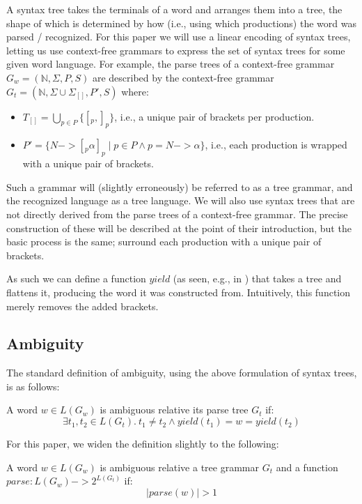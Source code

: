 \documentclass[acmsmall,review,anonymous]{acmart}\settopmatter{printfolios=true,printccs=false,printacmref=false}
\newcommand{\NT}{\mathbb{N}} %
\newcommand{\T}{\Sigma} %
\newcommand{\yield}{\mathit{yield}} %
\newcommand{\parse}{\mathit{parse}} %
\begin{document}
A syntax tree takes the terminals of a word and arranges them into a tree, the shape of which is determined by how (i.e., using which productions) the word was parsed / recognized. For this paper we will use a linear encoding of syntax trees, letting us use context-free grammars to express the set of syntax trees for some given word language. For example, the parse trees of a context-free grammar $G_w = (\NT, \T, P, S)$ are described by the context-free grammar $G_t = (\NT, \T \cup \T_{[]}, P', S)$ where:

\begin{itemize}
\item $T_{[]} = \bigcup_{p \in P} \{ [_p, ]_p \}$, i.e., a unique pair of brackets per production.
\item $P' = \{ N -> [_p \alpha ]_p \mid p \in P \land p = N -> \alpha \}$, i.e., each production is wrapped with a unique pair of brackets.
\end{itemize}

\noindent Such a grammar will (slightly erroneously) be referred to as a tree grammar, and the recognized language as a tree language. We will also use syntax trees that are not directly derived from the parse trees of a context-free grammar. The precise construction of these will be described at the point of their introduction, but the basic process is the same; surround each production with a unique pair of brackets.

As such we can define a function $\yield$ (as seen, e.g., in ) that takes a tree and flattens it, producing the word it was constructed from. Intuitively, this function merely removes the added brackets.

\subsection{Ambiguity}

The standard definition of ambiguity, using the above formulation of syntax trees, is as follows:

\begin{definition}
A word $w \in L(G_w)$ is ambiguous relative its parse tree $G_t$ if:
  \[ \exists t_1, t_2 \in L(G_t).\ t_1 \neq t_2 \land \yield(t_1) = w = \yield(t_2)\]
\end{definition}

\noindent For this paper, we widen the definition slightly to the following:

\begin{definition}
  A word $w \in L(G_w)$ is ambiguous relative a tree grammar $G_t$ and a function $\parse : L(G_w) -> 2^{L(G_t)}$ if:
  \[ |\parse(w)| > 1 \]
\end{definition}
\end{document}
